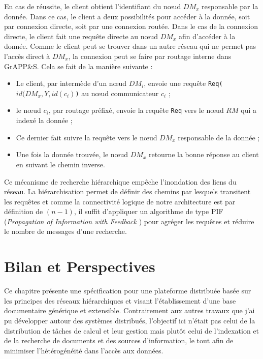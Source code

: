 En cas de réussite, le client obtient l'identifiant du n{\oe}ud $DM_x$ responsable par la donnée. Dans ce cas, le client a deux possibilités pour accéder à la donnée, soit par connexion directe, soit par une connexion routée. Dans le cas de la connexion directe, le client fait une requête directe au n{\oe}ud $DM_x$ afin d'accéder à la  donnée. Comme le client peut se trouver dans un autre réseau qui ne permet pas l'accès direct à $DM_x$, la connexion peut se faire par routage interne dans GrAPP\&S. Cela se fait de la manière suivante :
\begin{itemize}
	\item Le client, par intermède d'un n{\oe}ud $DM_i$, envoie une requête \texttt{Req($id(DM_x, Y, id(c_i)$)} au n{\oe}ud communicateur $c_i$ ;
	\item  le n{\oe}ud $c_i$, par routage préfixé, envoie la requête \texttt{Req} vers le n{\oe}ud $RM$ qui a indexé la donnée ;
	\item  Ce dernier fait suivre la requête vers le n{\oe}ud $DM_x$ responsable de la donnée ;
	\item Une fois la donnée trouvée, le n{\oe}ud $DM_x$ retourne la bonne réponse au client en suivant le chemin inverse.
\end{itemize}   

Ce mécanisme de recherche hiérarchique empêche l'inondation des liens du réseau. La hiérarchisation permet de définir des chemins par lesquels transitent les requêtes et comme la connectivité logique de notre architecture est par définition de $(n-1)$, il suffit d'appliquer un algorithme de type PIF (\textit{Propagation of Information with Feedback} \cite{Seg83}) pour agréger les requêtes et réduire le nombre de messages d'une recherche.  


\section{Bilan et Perspectives}

Ce chapitre présente une spécification pour une plateforme distribuée basée sur les principes des réseaux hiérarchiques et visant l'établissement d'une base documentaire générique et extensible. Contrairement aux autres travaux que j'ai pu développer autour des systèmes distribués, l'objectif ici n'était pas celui de la distribution de tâches de calcul et leur gestion mais plutôt celui de l'indexation et de la recherche de documents et des sources d'information, le tout afin de minimiser l'hétérogénéité dans l'accès aux données. 

